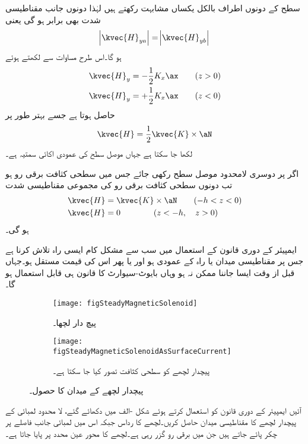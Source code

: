 سطح کے دونوں اطراف بالکل یکساں مشابہت رکھتے ہیں لہٰذا دونوں جانب  مقناطیسی شدت بھی برابر ہو گی یعنی
\begin{align*}
\abs{\kvec{H}_{ya}}=\abs{\kvec{H}_{yb}}
\end{align*}
ہو گا۔اس طرح مساوات  سے  لکھتے ہوئے
\begin{align*}
\kvec{H}_{y}&=-\frac{1}{2}K_x \ax \quad \quad (z>0)\\
\kvec{H}_{y}&=+\frac{1}{2}K_x \ax \quad \quad (z<0)
\end{align*}
حاصل ہوتا ہے جسے  بہتر طور پر 
\begin{align}
\kvec{H}=\frac{1}{2} \kvec{K} \times \aN
\end{align}
لکھا جا سکتا ہے جہاں  موصل سطح کی عمودی اکائی سمتیہ ہے۔

اگر  پر دوسری لامحدود موصل سطح رکھی جائے جس میں سطحی کثافت برقی رو  ہو تب دونوں سطحی کثافت برقی رو کی مجموعی مقناطیسی شدت
\begin{gather}
\begin{aligned}
\kvec{H}&=\kvec{K} \times \aN \quad \quad (-h <z < 0)\\
\kvec{H}&=0 \quad \quad \quad \quad  (z<-h, \quad z>0) 
\end{aligned}
\end{gather}
ہو گی۔

ایمپیئر کے دوری قانون کے استعمال میں سب سے مشکل کام ایسی راہ تلاش کرنا ہے جس پر مقناطیسی میدان یا راہ کے عمودی ہو اور یا پھر اس کی قیمت مستقل ہو۔جہاں قبل از وقت ایسا جاننا ممکن نہ ہو وہاں بایوٹ-سیوارٹ کا قانون ہی قابل استعمال ہو گا۔ 

\begin{figure}
\centering
\begin{subfigure}{0.5\textwidth}
\centering
\texttt{[image: figSteadyMagneticSolenoid]}
\caption{پیچ دار لچھا۔}
\end{subfigure}%
%
\begin{subfigure}{0.5\textwidth}
\centering
\texttt{[image: figSteadyMagneticSolenoidAsSurfaceCurrent]}
\caption{پیچدار لچھے کو سطحی کثافت تصور کیا جا سکتا ہے۔}
\end{subfigure}%
\caption{پیچدار لچھے کے میدان کا حصول۔}
\label{شکل-مقناطیسی_پیچدار_لچھا}
\end{figure}

آئیں ایمپیئر کے دوری قانون کو استعمال کرتے ہوئے شکل -الف میں دکھائے گئے، لا محدود لمبائی کے پیچدار لچھے  کا مقناطیسی میدان حاصل کریں۔لچھے کا رداس  جبکہ اس میں لمبائی جانب   فاصلے پر  چکر پائے جاتے ہیں جن میں برقی رو  گزر رہی ہے۔لچھے کا محور عین  محدد پر پایا جاتا ہے۔  

